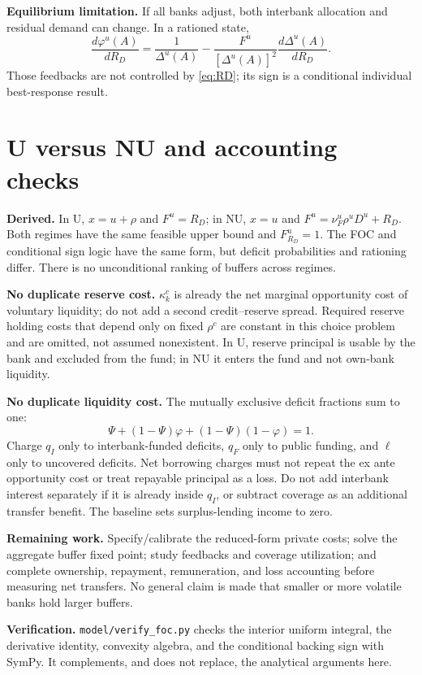 \documentclass[11pt,a4paper]{article}
\newcommand{\der}{\textbf{Derived.}}
\begin{document}
\textbf{Equilibrium limitation.} If all banks adjust, both interbank allocation and residual demand can change. In a rationed state,
\begin{equation}
 \frac{d\varphi^u(A)}{dR_D}=\frac1{\Delta^u(A)}
 -\frac{F^u}{[\Delta^u(A)]^2}\frac{d\Delta^u(A)}{dR_D}.
\end{equation}
Those feedbacks are not controlled by \eqref{eq:RD}; its sign is a conditional individual best-response result.

\section{U versus NU and accounting checks}
\der{} In U, $x=u+\rho$ and $F^u=R_D$; in NU, $x=u$ and $F^u=\nu_F^u\rho^uD^u+R_D$. Both regimes have the same feasible upper bound and $F^u_{R_D}=1$. The FOC and conditional sign logic have the same form, but deficit probabilities and rationing differ. There is no unconditional ranking of buffers across regimes.

\textbf{No duplicate reserve cost.} $\kappa_k^c$ is already the net marginal opportunity cost of voluntary liquidity; do not add a second credit--reserve spread. Required reserve holding costs that depend only on fixed $\rho^c$ are constant in this choice problem and are omitted, not assumed nonexistent. In U, reserve principal is usable by the bank and excluded from the fund; in NU it enters the fund and not own-bank liquidity.

\textbf{No duplicate liquidity cost.} The mutually exclusive deficit fractions sum to one:
\begin{equation}
 \Psi+(1-\Psi)\varphi+(1-\Psi)(1-\varphi)=1.
\end{equation}
Charge $q_I$ only to interbank-funded deficits, $q_F$ only to public funding, and $\ell$ only to uncovered deficits. Net borrowing charges must not repeat the ex ante opportunity cost or treat repayable principal as a loss. Do not add interbank interest separately if it is already inside $q_I$, or subtract coverage as an additional transfer benefit. The baseline sets surplus-lending income to zero.

\textbf{Remaining work.} Specify/calibrate the reduced-form private costs; solve the aggregate buffer fixed point; study feedbacks and coverage utilization; and complete ownership, repayment, remuneration, and loss accounting before measuring net transfers. No general claim is made that smaller or more volatile banks hold larger buffers.

\textbf{Verification.} \texttt{model/verify\_foc.py} checks the interior uniform integral, the derivative identity, convexity algebra, and the conditional backing sign with SymPy. It complements, and does not replace, the analytical arguments here.
\end{document}
